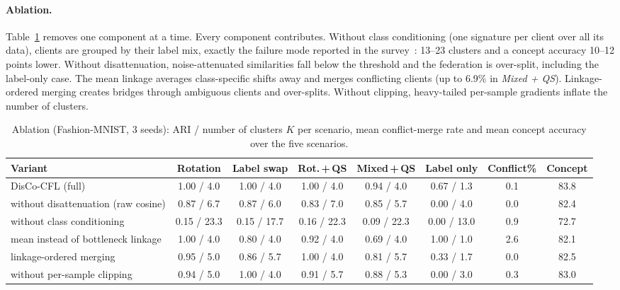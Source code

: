 \paragraph{Ablation.}
Table~\ref{tab:abl} removes one component at a time. Every component contributes. Without class conditioning (one signature per client over all its data), clients are grouped by their label mix, exactly the failure mode reported in the survey~\citep{benali2026survey}: 13--23 clusters and a concept accuracy 10--12 points lower. Without disattenuation, noise-attenuated similarities fall below the threshold and the federation is over-split, including the label-only case. The mean linkage averages class-specific shifts away and merges conflicting clients (up to 6.9\% in \emph{Mixed + QS}). Linkage-ordered merging creates bridges through ambiguous clients and over-splits. Without clipping, heavy-tailed per-sample gradients inflate the number of clusters.
\begin{table}[!htbp]
\centering
\caption{Ablation (Fashion-MNIST, 3 seeds): ARI / number of clusters $K$ per scenario, mean conflict-merge rate and mean concept accuracy over the five scenarios.}\label{tab:abl}
\scriptsize
\setlength{\tabcolsep}{3pt}
\begin{tabular}{lccccccc}
\toprule
Variant & Rotation & Label swap & Rot.\,+\,QS & Mixed\,+\,QS & Label only & Conflict\% & Concept \\
\midrule
DisCo-CFL (full) & 1.00 / 4.0 & 1.00 / 4.0 & 1.00 / 4.0 & 0.94 / 4.0 & 0.67 / 1.3 & 0.1 & 83.8 \\
without disattenuation (raw cosine) & 0.87 / 6.7 & 0.87 / 6.0 & 0.83 / 7.0 & 0.85 / 5.7 & 0.00 / 4.0 & 0.0 & 82.4 \\
without class conditioning & 0.15 / 23.3 & 0.15 / 17.7 & 0.16 / 22.3 & 0.09 / 22.3 & 0.00 / 13.0 & 0.9 & 72.7 \\
mean instead of bottleneck linkage & 1.00 / 4.0 & 0.80 / 4.0 & 0.92 / 4.0 & 0.69 / 4.0 & 1.00 / 1.0 & 2.6 & 82.1 \\
linkage-ordered merging & 0.95 / 5.0 & 0.86 / 5.7 & 1.00 / 4.0 & 0.81 / 5.7 & 0.33 / 1.7 & 0.0 & 82.5 \\
without per-sample clipping & 0.94 / 5.0 & 1.00 / 4.0 & 0.91 / 5.7 & 0.88 / 5.3 & 0.00 / 3.0 & 0.3 & 83.0 \\
\bottomrule
\end{tabular}
\end{table}
